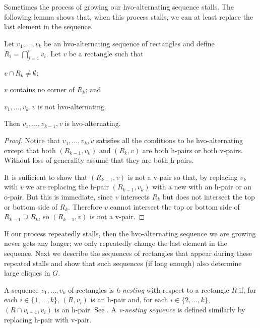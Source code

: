 \documentclass[lotsofwhite]{patmorin}
\begin{document}
Sometimes the process of growing our hvo-alternating sequence stalls. The
following lemma shows that, when this process stalls, we can at least
replace the last element in the sequence.

\begin{lem}
  Let $v_1,\ldots,v_k$ be an hvo-alternating sequence of rectangles and
  define $R_i=\bigcap_{j=1}^i v_i$. Let $v$ be a rectangle such
  that 
  \begin{compactenum}
     \item $v\cap R_k\ne \emptyset$; 
     \item $v$ contains no corner of $R_k$; and 
     \item $v_1,\ldots,v_k,v$ is not hvo-alternating.
  \end{compactenum}
  Then $v_1,\ldots,v_{k-1},v$ is hvo-alternating.
\end{lem}

\begin{proof}
  Notice that $v_1,\ldots,v_k,v$ satisfies all the conditions to be
  hvo-alternating except that both $(R_{k-1},v_k)$ and $(R_k,v)$
  are both h-pairs or both v-pairs.  Without loss of generality assume
  that they are both h-pairs.

  It is sufficient to show that $(R_{k-1},v)$ is not a v-pair so that,
  by replacing $v_k$ with $v$ we are replacing the h-pair $(R_{k-1},v_k)$
  with a new with an h-pair or an o-pair.  But this is immediate, since
  $v$ intersects $R_k$ but does not intersect the top or bottom side
  of $R_k$.  Therefore $v$ cannot intersect the top or bottom side of
  $R_{k-1}\supseteq R_k$, so $(R_{k-1},v)$ is not a v-pair.
\end{proof}

If our process repeatedly stalls, then the hvo-alternating sequence we
are growing never gets any longer; we only repeatedly change the last
element in the sequence. Next we describe the sequences of rectangles
that appear during these repeated stalls and show that such sequences
(if long enough) also determine large cliques in $G$.

A sequence $v_1,\ldots,v_k$ of rectangles is \emph{h-nesting} with
respect to a rectangle $R$ if, for each $i\in\{1,\ldots,k\}$, $(R,v_i)$
is an h-pair and, for each $i\in\{2,\ldots,k\}$, $(R\cap v_{i-1},v_i)$
is an h-pair.  See .  A \emph{v-nesting sequence} is
defined similarly by replacing h-pair with v-pair.
\end{document}
